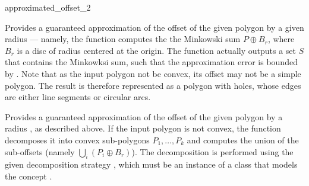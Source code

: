 
\ccRefPageBegin

\begin{ccRefFunction}{approximated_offset_2}


   {Provides a guaranteed approximation of the offset of the given polygon
     by a given radius  --- namely, the function computes the
    the Minkowski sum $P \oplus B_r$, where $B_r$ is a disc of radius
     centered at the origin.
    The function actually outputs a set $S$ that contains the Minkowksi sum,
    such that the approximation error is bounded by .
    Note that as the input polygon not be convex, its offset may not be a
    simple polygon. The result is therefore represented as a polygon with
    holes, whose edges are either line segments or circular arcs.
    }

   {Provides a guaranteed approximation of the offset of the given polygon
     by a radius , as described above.
    If the input polygon  is not convex, the function
    decomposes it into convex sub-polygons $P_1, \ldots, P_k$ and computes
    the union of the sub-offsets (namely $\bigcup_{i}{(P_i \oplus B_r)}$).
    The decomposition is performed using the given decomposition strategy
    , which must be an instance of a class that models the
    concept .
    }

\end{ccRefFunction}

\ccRefPageEnd
